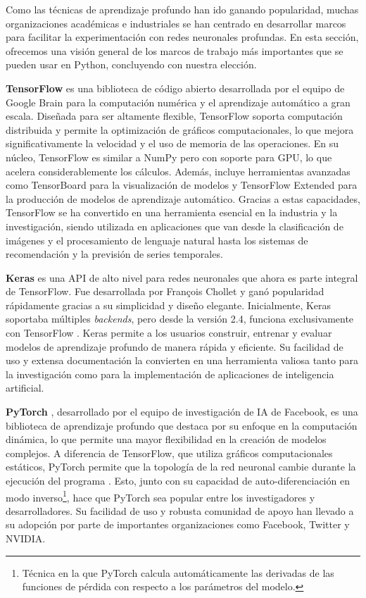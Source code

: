 Como las técnicas de aprendizaje profundo han ido ganando popularidad, muchas organizaciones académicas e industriales se han centrado en desarrollar marcos para facilitar la experimentación con redes neuronales profundas. En esta sección, ofrecemos una visión general de los marcos de trabajo más importantes que se pueden usar en Python, concluyendo con nuestra elección.


\textbf{TensorFlow} \citep{tensorflow} es una biblioteca de código abierto desarrollada por el equipo de Google Brain para la computación numérica y el aprendizaje automático a gran escala. Diseñada para ser altamente flexible, TensorFlow soporta computación distribuida y permite la optimización de gráficos computacionales, lo que mejora significativamente la velocidad y el uso de memoria de las operaciones. En su núcleo, TensorFlow es similar a NumPy pero con soporte para GPU, lo que acelera considerablemente los cálculos. Además, incluye herramientas avanzadas como TensorBoard para la visualización de modelos y TensorFlow Extended para la producción de modelos de aprendizaje automático. Gracias a estas capacidades, TensorFlow se ha convertido en una herramienta esencial en la industria y la investigación, siendo utilizada en aplicaciones que van desde la clasificación de imágenes y el procesamiento de lenguaje natural hasta los sistemas de recomendación y la previsión de series temporales.


\textbf{Keras} \citep{keras} es una API de alto nivel para redes neuronales que ahora es parte integral de TensorFlow. Fue desarrollada por François Chollet y ganó popularidad rápidamente gracias a su simplicidad y diseño elegante. Inicialmente, Keras soportaba múltiples \textit{backends}, pero desde la versión 2.4, funciona exclusivamente con TensorFlow \citep{muller2016introduction}. Keras permite a los usuarios construir, entrenar y evaluar modelos de aprendizaje profundo de manera rápida y eficiente. Su facilidad de uso y extensa documentación la convierten en una herramienta valiosa tanto para la investigación como para la implementación de aplicaciones de inteligencia artificial.



\textbf{PyTorch} \citep{pytorch}, desarrollado por el equipo de investigación de IA de Facebook, es una biblioteca de aprendizaje profundo que destaca por su enfoque en la computación dinámica, lo que permite una mayor flexibilidad en la creación de modelos complejos. A diferencia de TensorFlow, que utiliza gráficos computacionales estáticos, PyTorch permite que la topología de la red neuronal cambie durante la ejecución del programa \citep{mahmoud2019dlbench}. Esto, junto con su capacidad de auto-diferenciación en modo inverso\footnote{Técnica en la que PyTorch calcula automáticamente las derivadas de las funciones de pérdida con respecto a los parámetros del modelo.}, hace que PyTorch sea popular entre los investigadores y desarrolladores. Su facilidad de uso y robusta comunidad de apoyo han llevado a su adopción por parte de importantes organizaciones como Facebook, Twitter y NVIDIA.



